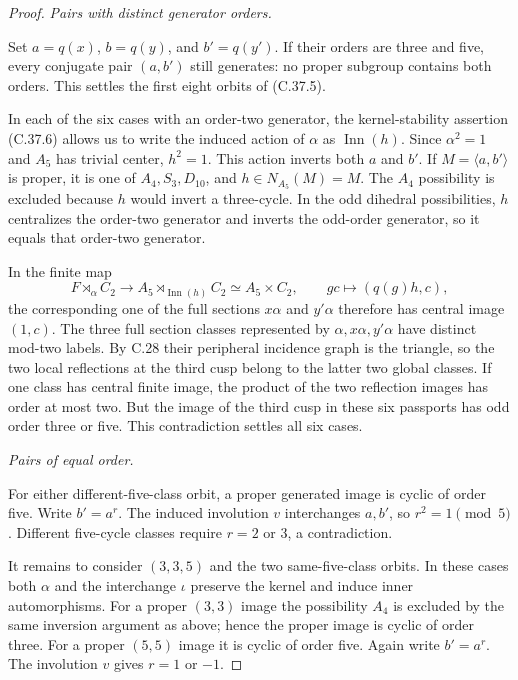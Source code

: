 \begin{proof}
\emph{Pairs with distinct generator orders.}\par
Set \(a=q(x)\), \(b=q(y)\), and \(b'=q(y')\).
If their orders are three and five, every conjugate pair
\((a,b')\) still generates: no proper subgroup contains
both orders. This settles the first eight orbits of (C.37.5).

In each of the six cases with an order-two generator, the
kernel-stability assertion (C.37.6) allows us to write the
induced action of \(\alpha\) as \(\operatorname{Inn}(h)\).
Since \(\alpha^2=1\) and \(A_5\) has trivial center,
\(h^2=1\). This action inverts both \(a\) and \(b'\).
If \(M=\langle a,b'\rangle\) is proper, it is one of
\(A_4,S_3,D_{10}\), and \(h\in N_{A_5}(M)=M\).
The \(A_4\) possibility is excluded because \(h\) would
invert a three-cycle. In the odd dihedral possibilities,
\(h\) centralizes the order-two generator and inverts the
odd-order generator, so it equals that order-two generator.

In the finite map
\[
 F\rtimes_\alpha C_2\longrightarrow
 A_5\rtimes_{\operatorname{Inn}(h)}C_2
              \simeq A_5\times C_2,
 \qquad gc\longmapsto(q(g)h,c),
\]
the corresponding one of the full sections \(x\alpha\)
and \(y'\alpha\) therefore has central image \((1,c)\).
The three full section classes represented by
\(\alpha,x\alpha,y'\alpha\) have distinct mod-two
labels. By C.28 their peripheral incidence graph is the
triangle, so the two local reflections at the third cusp
belong to the latter two global classes. If one class has
central finite image, the product of the two reflection
images has order at most two. But the image of the third
cusp in these six passports has odd order three or five.
This contradiction settles all six cases.

\emph{Pairs of equal order.}\par
For either different-five-class orbit, a proper generated
image is cyclic of order five. Write \(b'=a^r\).
The induced involution \(v\) interchanges \(a,b'\),
so \(r^2=1\pmod5\). Different five-cycle classes
require \(r=2\) or \(3\), a contradiction.

It remains to consider \((3,3,5)\) and the two same-five-class
orbits. In these cases both \(\alpha\) and the interchange
\(\iota\) preserve the kernel and induce inner
automorphisms. For a proper \((3,3)\) image the possibility
\(A_4\) is excluded by the same inversion argument as
above; hence the proper image is cyclic of order three.
For a proper \((5,5)\) image it is cyclic of order five.
Again write \(b'=a^r\). The involution \(v\) gives
\(r=1\) or \(-1\).


\end{proof}
